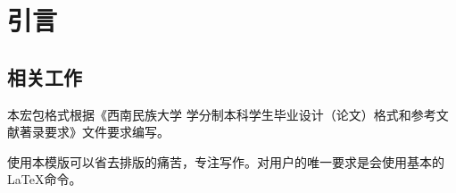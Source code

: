 \chapter{引言}
\section{相关工作}

本宏包格式根据《西南民族大学
学分制本科学生毕业设计（论文）格式和参考文献著录要求》文件要求编写。

使用本模版可以省去排版的痛苦，专注写作。对用户的唯一要求是会使用基本的\LaTeX{}\cite{knuth1986texbook, Alt2015UIST, Buschek:2013:UTM:2493190.2493206}命令。